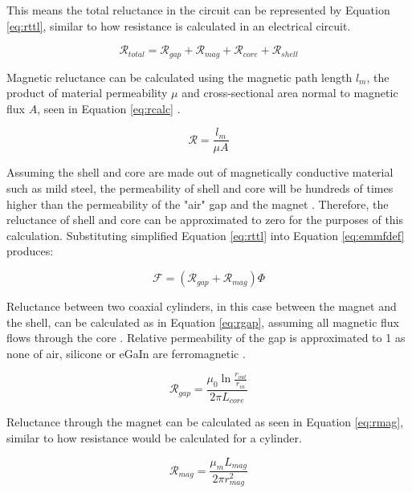\documentclass[a4paper,12pt]{article}
\begin{document}
This means the total reluctance in the circuit can be represented by Equation \ref{eq:rttl}, similar to how resistance is calculated in an electrical circuit.

\begin{equation}\label{eq:rttl}
    \mathcal{R}_{total}=\mathcal{R}_{gap}+\mathcal{R}_{mag}+\mathcal{R}_{core}+\mathcal{R}_{shell}
\end{equation}

Magnetic reluctance can be calculated using the magnetic path length $l_m$, the product of material permeability $\mu$ and cross-sectional area normal to magnetic flux $A$, seen in Equation \ref{eq:rcalc} \cite{coatesTransformerCoresReluctance2018}.

\begin{equation}\label{eq:rcalc}
    \mathcal{R}=\frac{l_m}{\mu A}
\end{equation}

Assuming the shell and core are made out of magnetically conductive material such as mild steel, the permeability of shell and core will be hundreds of times higher than the permeability of the "air" gap and the magnet \cite{engineeringtoolboxPermeability2016}. Therefore, the reluctance of shell and core can be approximated to zero for the purposes of this calculation.
Substituting simplified Equation \ref{eq:rttl} into Equation \ref{eq:emmfdef} produces:

\begin{equation}\label{eq:emmfreal}
    \mathcal{F}=(\mathcal{R}_{gap}+\mathcal{R}_{mag})\Phi
\end{equation}

Reluctance between two coaxial cylinders, in this case between the magnet and the shell, can be calculated as in Equation \ref{eq:rgap}, assuming all magnetic flux flows through the core \cite{changChapterElectrodynamics2006}. Relative permeability of the gap is approximated to 1 as none of air, silicone or eGaIn are ferromagnetic \cite{engineeringtoolboxPermeability2016}.

\begin{equation}\label{eq:rgap}
    \mathcal{R}_{gap}=\frac{\mu_0 \ln{\frac{r_{out}}{r_{in}}}}{2\pi L_{core}}
\end{equation}

Reluctance through the magnet can be calculated as seen in Equation \ref{eq:rmag}, similar to how resistance would be calculated for a cylinder.

\begin{equation}\label{eq:rmag}
    \mathcal{R}_{mag}=\frac{\mu_m L_{mag}}{2\pi r_{mag}^2}
\end{equation}
\end{document}
